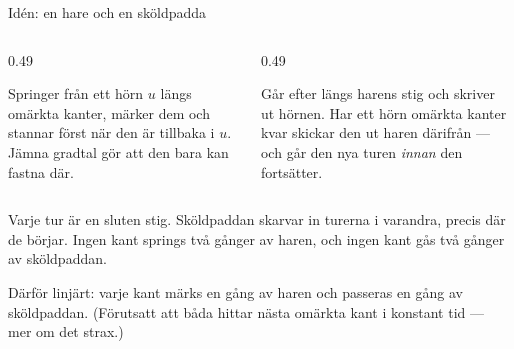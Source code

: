 \documentclass[11pt,aspectratio=169,xcolor=table,t]{beamer}
\begin{document}
\begin{frame}{Idén: en hare och en sköldpadda}
\begin{columns}[T]
\begin{column}{0.49\textwidth}
\begin{infobox}[title={\textbf{Haren} (Viggos \textsc{PathFinder})},coltitle=white,colbacktitle=kthorange,
  colframe=kthorange,fonttitle=\small,toptitle=1pt,bottomtitle=1pt]
Springer från ett hörn $u$ längs omärkta kanter, märker dem och stannar först när den är
tillbaka i $u$. Jämna gradtal gör att den bara kan fastna där.
\end{infobox}
\end{column}
\begin{column}{0.49\textwidth}
\begin{infobox}[title={\textbf{Sköldpaddan} (Viggos \textsc{Straggler})},coltitle=white,colbacktitle=kthgreen,
  colframe=kthgreen,fonttitle=\small,toptitle=1pt,bottomtitle=1pt]
Går efter längs harens stig och skriver ut hörnen. Har ett hörn omärkta kanter kvar skickar
den ut haren därifrån — och går den nya turen \emph{innan} den fortsätter.
\end{infobox}
\end{column}
\end{columns}
\medskip
\small
Varje tur är en sluten stig. Sköldpaddan skarvar in turerna i varandra, precis där de börjar.
Ingen kant springs två gånger av haren, och ingen kant gås två gånger av sköldpaddan.
\medskip
\begin{ahabox}
Därför linjärt: varje kant märks en gång av haren och passeras en gång av sköldpaddan.
(Förutsatt att båda hittar nästa omärkta kant i konstant tid — mer om det strax.)
\end{ahabox}
\end{frame}
\end{document}
